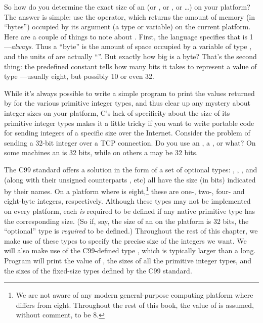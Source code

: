 So how do you determine the exact size of an  (or , or
, or \ldots) on your platform?
The answer is simple: use the  operator, which returns
the amount of memory (in ``bytes'') occupied by its argument (a type
or variable) on the current platform.
Here are a couple of things to note about .  First, the
language specifies that  is 1---\emph{always}.
Thus a ``byte'' is the amount of space occupied by a variable of type
, and the units 
of  are actually ``''.
But exactly how big is a byte?  That's the second thing:
the predefined constant  tells how many bits it takes
to represent a value of type ---usually eight,
but possibly 10 or even 32.

While it's always possible to write a 
simple program to print the values returned by  for
the various primitive integer types, and thus clear up any mystery
about integer sizes on your platform, C's lack of specificity about
the size of its primitive integer types makes it a 
little tricky if you want to write portable code for sending
integers of a specific size over the Internet.  Consider the problem
of sending a 32-bit integer over a TCP connection.  Do you use an
, a , or what?
On some machines an  is 32 bits,
while on others a  may be 32 bits.

The C99 standard offers a solution in the form of a set of optional types:
, , , and 
(along with their unsigned counterparts , etc) all
have the size (in bits) indicated by their names.  On a platform where
 is eight,\footnote{%
We are not aware of any modern general-purpose computing platform
where  differs from eight.
Throughout the rest of this book, the value of
 is assumed, without comment, to be 8.}
%
these are one-, two-, four- and eight-byte integers, respectively.
%
Although these types may not be implemented on every platform,
each \emph{is\/} required to be defined if any native primitive type
has the corresponding size.  (So if, say, the size of an  on the
platform is 32 bits, the ``optional'' type  is
\emph{required\/} to be defined.)
%
Throughout the rest of this chapter, we make use of these types to
specify the precise size of the integers we want.  We will also make
use of the C99-defined type , which is typically
larger than a long.
%
Program  will print the value of ,
the sizes of all the primitive integer
types, and the sizes of the
fixed-size types defined by the C99 standard.
%
%

